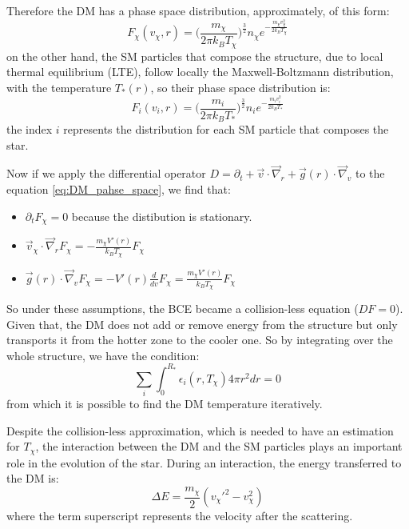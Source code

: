 Therefore the DM has a phase space distribution, approximately, of this form:
\begin{equation}
\label{eq:DM_pahse_space}
    F_{\chi}(v_{\chi},r)=\Big(\frac{m_{\chi}}{2\pi k_{B}T_{\chi}}\Big)^{\frac{3}{2}}n_{\chi} e^{-\frac{m_{\chi}v^2_{\chi}}{2 k_B T_{\chi}}}
\end{equation}
on the other hand, the SM particles that compose the structure, due to local thermal equilibrium (LTE), follow locally the Maxwell-Boltzmann distribution, with the temperature $T_{*}(r)$, so their phase space distribution is:
\begin{equation*}
    F_{i}(v_i,r)=\Big(\frac{m_{i}}{2\pi k_{B}T_{*}}\Big)^{\frac{3}{2}}n_{i} e^{-\frac{m_i v^2_{i}}{2 k_B T_{*}}}
\end{equation*}
the index $i$ represents the distribution for each SM particle that composes the star.

Now if we apply the differential operator $D=\partial_t+\Vec{v}\cdot \Vec{\nabla}_r+ \Vec{g}(r)\cdot \Vec{\nabla}_v$ to the equation \ref{eq:DM_pahse_space}, we find that:
\begin{itemize}
    \item $\partial_t F_{\chi}=0$ because the distibution is stationary.
    \item $\Vec{v}_{\chi}\cdot \Vec{\nabla}_r F_{\chi}= -\frac{m_{\chi}V'(r)}{k_B T_{\chi}}F_{\chi}$
    \item $\Vec{g}(r)\cdot\Vec{\nabla}_v F_{\chi}=-V'(r)\frac{d}{dv}F_{\chi}=\frac{m_{\chi}V'(r)}{k_B T_{\chi}}F_{\chi}$
\end{itemize}
So under these assumptions, the BCE became a collision-less equation ($DF=0$). 
Given that, the DM does not add or remove energy from the structure but only transports it from the hotter zone to the cooler one. So by integrating over the whole structure, we have the condition\cite{DMSun}:
\begin{equation}
    \sum_i \int _0^{R_{*}} \epsilon_i(r,T_{\chi})4 \pi r^2 dr=0
\end{equation}
from which it is possible to find the DM temperature iteratively.

Despite the collision-less approximation, which is needed to have an estimation for $T_{\chi}$, the interaction between the DM and the SM particles plays an important role in the evolution of the star. During an interaction, the energy transferred to the DM is:
\begin{equation*}
    \Delta E= \frac{m_{\chi}}{2}(v_{\chi}'^2-v_{\chi}^2)
\end{equation*}
where the term superscript represents the velocity after the scattering. 

